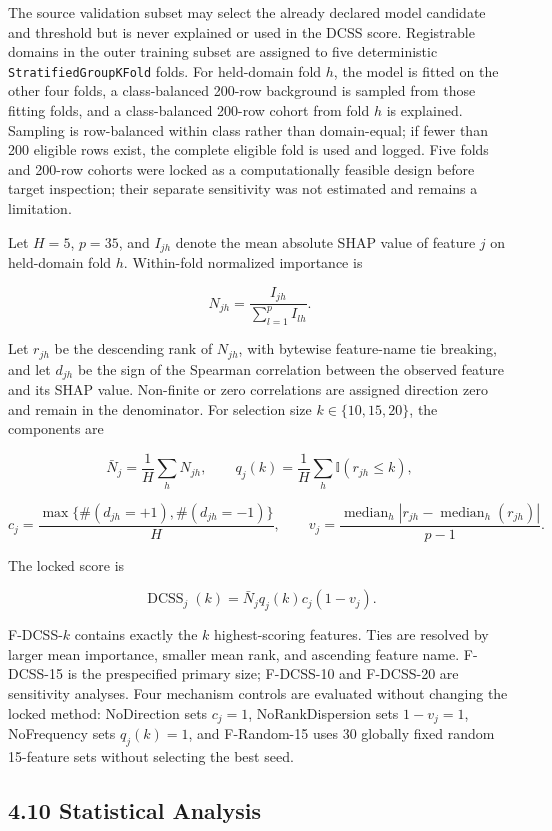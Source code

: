 \documentclass[
  10pt,
]{article}
\begin{document}
The source validation subset may select the already declared model
candidate and threshold but is never explained or used in the DCSS
score. Registrable domains in the outer training subset are assigned to
five deterministic \texttt{StratifiedGroupKFold} folds. For held-domain
fold \(h\), the model is fitted on the other four folds, a
class-balanced 200-row background is sampled from those fitting folds,
and a class-balanced 200-row cohort from fold \(h\) is explained.
Sampling is row-balanced within class rather than domain-equal; if fewer
than 200 eligible rows exist, the complete eligible fold is used and
logged. Five folds and 200-row cohorts were locked as a computationally
feasible design before target inspection; their separate sensitivity was
not estimated and remains a limitation.

Let \(H=5\), \(p=35\), and \(I_{jh}\) denote the mean absolute SHAP
value of feature \(j\) on held-domain fold \(h\). Within-fold normalized
importance is

\[
N_{jh}=\frac{I_{jh}}{\sum_{l=1}^{p}I_{lh}}.
\]

Let \(r_{jh}\) be the descending rank of \(N_{jh}\), with bytewise
feature-name tie breaking, and let \(d_{jh}\) be the sign of the
Spearman correlation between the observed feature and its SHAP value.
Non-finite or zero correlations are assigned direction zero and remain
in the denominator. For selection size \(k\in\{10,15,20\}\), the
components are

\[
\bar{N}_j=\frac{1}{H}\sum_h N_{jh}, \qquad
q_j(k)=\frac{1}{H}\sum_h \mathbb{I}(r_{jh}\leq k),
\]

\[
c_j=\frac{\max\{\#(d_{jh}=+1),\#(d_{jh}=-1)\}}{H}, \qquad
v_j=\frac{\operatorname{median}_h|r_{jh}-\operatorname{median}_h(r_{jh})|}{p-1}.
\]

The locked score is

\[
\operatorname{DCSS}_j(k)=\bar{N}_j q_j(k)c_j(1-v_j).
\]

F-DCSS-\(k\) contains exactly the \(k\) highest-scoring features. Ties
are resolved by larger mean importance, smaller mean rank, and ascending
feature name. F-DCSS-15 is the prespecified primary size; F-DCSS-10 and
F-DCSS-20 are sensitivity analyses. Four mechanism controls are
evaluated without changing the locked method: NoDirection sets
\(c_j=1\), NoRankDispersion sets \(1-v_j=1\), NoFrequency sets
\(q_j(k)=1\), and F-Random-15 uses 30 globally fixed random 15-feature
sets without selecting the best seed.

\subsection{4.10 Statistical Analysis}\label{statistical-analysis}
\end{document}
